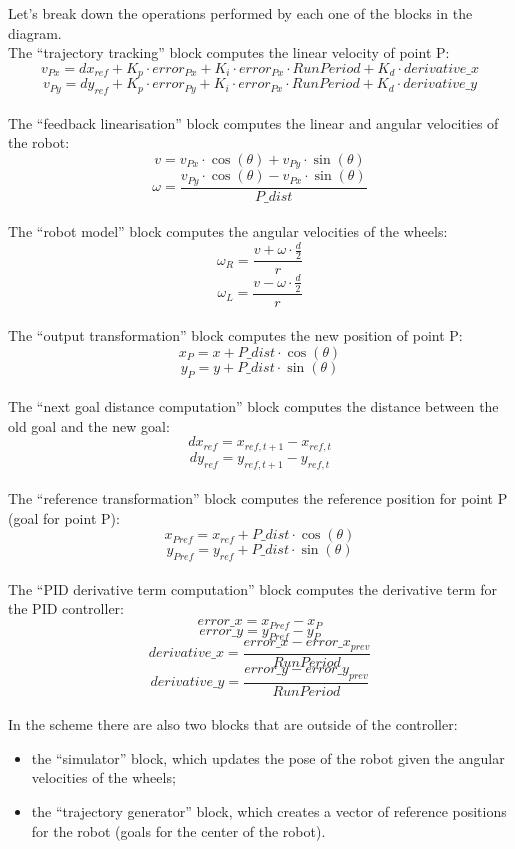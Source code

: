 \documentclass[11pt,a4paper]{article}
\begin{document}
Let's break down the operations performed by each one of the blocks in the diagram.\\

The ``trajectory tracking'' block computes the linear velocity of point P:
$$v_{Px} = dx_{ref} + K_p \cdot error_{Px} + K_i \cdot error_{Px} \cdot RunPeriod + K_d \cdot derivative\_x$$
$$v_{Py} = dy_{ref} + K_p \cdot error_{Py} + K_i \cdot error_{Px} \cdot RunPeriod + K_d \cdot derivative\_y$$ \\

The ``feedback linearisation'' block computes the linear and angular velocities of the robot:
$$v = v_{Px} \cdot \cos(\theta)  +  v_{Py} \cdot \sin(\theta)$$
$$\omega = \frac {v_{Py} \cdot \cos(\theta)  - v_{Px} \cdot \sin(\theta)}{P\_dist}$$ \\

The ``robot model'' block computes the angular velocities of the wheels:
$$\omega_R = \frac {v + \omega \cdot \frac{d}{2}}{r}$$
$$\omega_L = \frac {v - \omega \cdot \frac{d}{2}}{r}$$ \\

The ``output transformation'' block computes the new position of point P:
$$x_P = x + P\_dist \cdot \cos(\theta)$$
$$y_P = y + P\_dist \cdot \sin(\theta)$$ \\

The ``next goal distance computation'' block computes the distance between the old goal and the new goal:
$$dx_{ref} = x_{ref,t+1} - x_{ref,t} $$
$$dy_{ref} = y_{ref,t+1} - y_{ref,t} $$ \\

The ``reference transformation'' block computes the reference position for point P (goal for point P):
$$x_{Pref} = x_{ref} + P\_dist \cdot \cos(\theta)$$
$$y_{Pref} = y_{ref} + P\_dist \cdot \sin(\theta)$$ \\

The ``PID derivative term computation'' block computes the derivative term for the PID controller:
$$error\_x = x_{Pref} - x_P$$
$$error\_y = y_{Pref} - y_P$$
$$derivative\_x = \frac {error\_x - error\_x_{prev}}{RunPeriod}$$
$$derivative\_y = \frac {error\_y - error\_y_{prev}}{RunPeriod}$$ \\

In the scheme there are also two blocks that are outside of the controller:
\begin{itemize}
    \item the ``simulator'' block, which updates the pose of the robot given the angular velocities of the wheels;
    \item the ``trajectory generator'' block, which creates a vector of reference positions for the robot
            (goals for the center of the robot).
\end{itemize}
\end{document}
